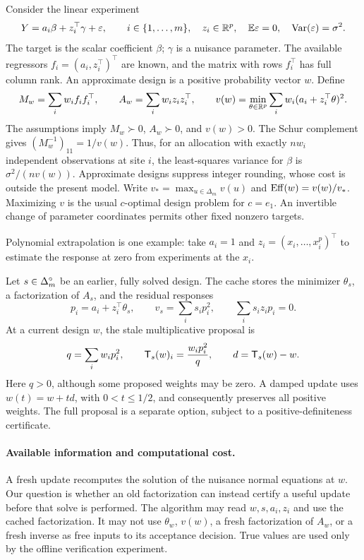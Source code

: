 \documentclass[11pt]{article}
\begin{document}
Consider the linear experiment
\begin{equation}\label{eq:model}
 Y=a_i\beta+z_i^\top\gamma+\varepsilon,
 \qquad i\in\{1,\ldots,m\},\quad z_i\in\mathbb R^p,
 \quad \mathbb E\varepsilon=0,\quad \operatorname{Var}(\varepsilon)=\sigma^2.
\end{equation}
The target is the scalar coefficient $\beta$; $\gamma$ is a nuisance parameter.
The available regressors $f_i=(a_i,z_i^\top)^\top$ are known, and the matrix with rows $f_i^\top$ has full column rank. An approximate design is a positive probability vector $w$. Define
\begin{equation}\label{eq:value}
 M_w=\sum_iw_if_if_i^\top,\qquad
 A_w=\sum_iw_iz_iz_i^\top,\qquad
 v(w)=\min_{\theta\in\mathbb R^p}\sum_iw_i(a_i+z_i^\top\theta)^2.
\end{equation}
The assumptions imply $M_w\succ0$, $A_w\succ0$, and $v(w)>0$.
The Schur complement gives $(M_w^{-1})_{11}=1/v(w)$.
Thus, for an allocation with exactly $nw_i$ independent observations at site $i$, the least-squares variance for $\beta$ is $\sigma^2/(nv(w))$.
Approximate designs suppress integer rounding, whose cost is outside the present model.
Write $v_* =\max_{u\in\Delta_m}v(u)$ and
$\operatorname{Eff}(w)=v(w)/v_*$. Maximizing $v$ is the usual $c$-optimal design problem for $c=e_1$.
An invertible change of parameter coordinates permits other fixed nonzero targets.

Polynomial extrapolation is one example: take $a_i=1$ and
$z_i=(x_i,\ldots,x_i^p)^\top$ to estimate the response at zero from experiments at the $x_i$.

Let $s\in\Delta_m^\circ$ be an earlier, fully solved design. The cache stores the minimizer $\theta_s$, a factorization of $A_s$, and the residual responses
\begin{equation}\label{eq:cache}
 p_i=a_i+z_i^\top\theta_s,\qquad
 v_s=\sum_i s_i p_i^2,\qquad \sum_i s_i z_i p_i=0.
\end{equation}
At a current design $w$, the stale multiplicative proposal is
\begin{equation}\label{eq:proposal}
 q=\sum_iw_ip_i^2,\qquad
 \mathsf T_s(w)_i=\frac{w_ip_i^2}{q},\qquad d=\mathsf T_s(w)-w.
\end{equation}
Here $q>0$, although some proposed weights may be zero.
A damped update uses $w(t)=w+td$, with $0<t\le1/2$, and consequently preserves all positive weights.
The full proposal is a separate option, subject to a positive-definiteness certificate.

\paragraph{Available information and computational cost.}
A fresh update recomputes the solution of the nuisance normal equations at $w$.
Our question is whether an old factorization can instead certify a useful update before that solve is performed.
The algorithm may read $w,s,a_i,z_i$ and use the cached factorization.
It may not use $\theta_w$, $v(w)$, a fresh factorization of $A_w$, or a fresh inverse as free inputs to its acceptance decision.
True values are used only by the offline verification experiment.
\end{document}
